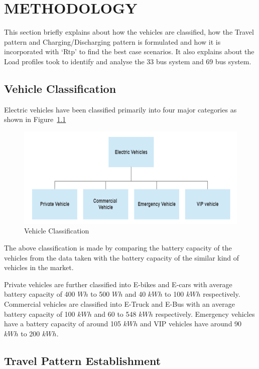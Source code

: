 	\chapter{METHODOLOGY}
	\label{chap:methodology}
	
	This section briefly explains about how the vehicles are classified, how the Travel pattern and Charging/Discharging pattern is formulated and how it is incorporated with `Rtp' to find the best case scenarios. It also explains about the Load profiles took to identify and analyse the 33 bus system and 69 bus system.
	
	\section{Vehicle Classification}
	
	 Electric vehicles have been classified primarily into four major categories as shown in Figure~\ref{fig:classification} 
	 	
			\begin{figure}[h]
				\centering
				\includegraphics[width=0.7\linewidth]{./Figures/classification}
				\caption{Vehicle Classification}
				\label{fig:classification}
			\end{figure}
		
	The above classification is made by comparing the battery capacity of the vehicles from the data taken with the battery capacity of the similar kind of vehicles in the market.

	\par {Private vehicles are further classified into E-bikes and E-cars with average battery capacity of 400 $Wh$ to 500 $Wh$ and 40 $kWh$ to 100 $kWh$ respectively. Commercial vehicles are classified into E-Truck and E-Bus with an average battery capacity of 100 $kWh$ and 60 to 548 $kWh$ respectively. Emergency vehicles have a battery capacity of around 105 $kWh$ and VIP vehicles have around 90 $kWh$ to 200 $kWh$.
	}
	
	\section{Travel Pattern Establishment}
	
